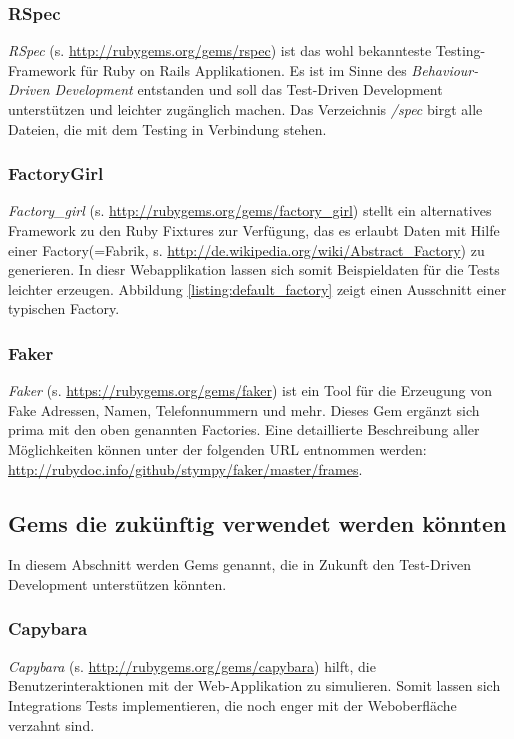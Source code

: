 \documentclass[12pt,             %
               a4paper,          %
               listof=totoc,     %
               index=totoc,      %
               bibliography=totoc,%
               oneside,         %
               BCOR1cm,          %
               english   %
               ]{scrbook}
\begin{document}
\subsubsection{RSpec}
\textit{RSpec} (s. \url{http://rubygems.org/gems/rspec}) ist das wohl bekannteste Testing-Framework für Ruby on Rails Applikationen. Es ist im Sinne des \textit{Behaviour-Driven Development} entstanden und soll das Test-Driven Development unterstützen und leichter zugänglich machen. Das Verzeichnis \textit{/spec} birgt alle Dateien, die mit dem Testing in Verbindung stehen.

\subsubsection{FactoryGirl}
\textit{Factory\_girl} (s. \url{http://rubygems.org/gems/factory_girl}) stellt ein alternatives Framework zu den Ruby Fixtures zur Verfügung, das es erlaubt Daten mit Hilfe einer \glqq Factory\grqq (=Fabrik, s. \url{http://de.wikipedia.org/wiki/Abstract_Factory}) zu generieren. In diesr Webapplikation lassen sich somit Beispieldaten für die Tests leichter erzeugen. Abbildung \vref{listing:default_factory} zeigt einen Ausschnitt einer typischen Factory.  

\label{listing:default_factory}

\subsubsection{Faker}
\textit{Faker} (s. \url{https://rubygems.org/gems/faker}) ist ein Tool für die Erzeugung von Fake Adressen, Namen, Telefonnummern und mehr. Dieses Gem ergänzt sich prima mit den oben genannten Factories. Eine detaillierte Beschreibung aller Möglichkeiten können unter der folgenden URL entnommen werden: \url{http://rubydoc.info/github/stympy/faker/master/frames}.

\subsection{Gems die zukünftig verwendet werden könnten}
In diesem Abschnitt werden Gems genannt, die in Zukunft den Test-Driven Development unterstützen könnten.
\subsubsection{Capybara}
\textit{Capybara} (s. \url{http://rubygems.org/gems/capybara}) hilft, die Benutzerinteraktionen mit der Web-Applikation zu simulieren. Somit lassen sich Integrations Tests implementieren, die noch enger mit der Weboberfläche verzahnt sind.
\end{document}

